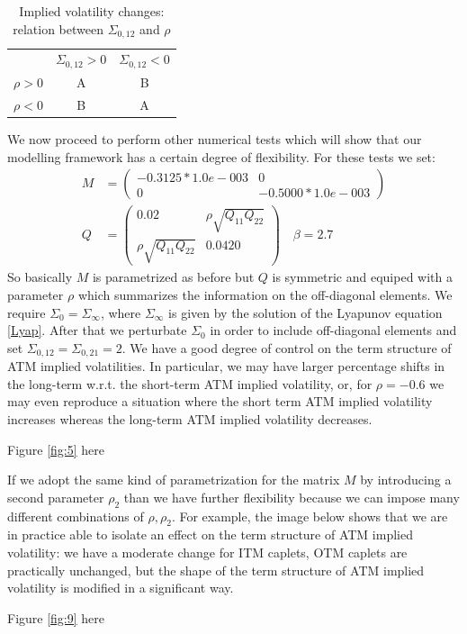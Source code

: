 \begin{table}[h]
\centering
	\begin{tabular}{ccc}
	 &$\Sigma_{0,12}>0$&$\Sigma_{0,12}<0$\\
	 $\rho>0$&A&B\\
	 $\rho<0$&B&A\\
	\end{tabular}
	\caption{Implied volatility changes: relation between $\Sigma_{0,12}$ and $\rho$}
	\label{tab:ImpliedVolatilityChanges_rho}
\end{table}

We now proceed to perform other numerical tests which will show that our modelling framework has a certain degree of flexibility. For these tests we set:
\begin{align}
M&=\left(\begin{array}{cc} -0.3125*1.0e-003&0\\ 0& -0.5000*1.0e-003\end{array}\right)\nonumber\\
Q&=\left(\begin{array}{cc} 0.02&\rho \sqrt{Q_{11}Q_{22}}\\ \rho \sqrt{Q_{11}Q_{22}}&0.0420\end{array}\right)\quad \beta=2.7\nonumber
\end{align}
So basically $M$ is parametrized  as before but $Q$ is symmetric and equiped with a parameter $\rho$ which summarizes the information on the off-diagonal elements. We require $\Sigma_0=\Sigma_\infty$, where $\Sigma_\infty$ is given by the solution of the Lyapunov equation \eqref{Lyap}. After that we perturbate $\Sigma_0$ in order to include off-diagonal elements and set $\Sigma_{0,12}=\Sigma_{0,21}=2$.
We have a good degree of control on the term structure of ATM implied volatilities. In particular, we may have larger percentage shifts in the long-term w.r.t. the short-term ATM implied volatility, or, for $\rho=-0.6$ we may even reproduce a situation where the short term ATM implied volatility increases whereas the long-term ATM implied volatility decreases.
\begin{center}
Figure \eqref{fig:5}  here
\end{center}

If we adopt the same kind of parametrization for the matrix $M$ by introducing a second parameter $\rho_2$ than we have further flexibility because we can impose many different combinations of $\rho,\rho_2$. For example, the image below shows that we are in practice able  to isolate an effect on the term structure of ATM implied volatility: we have a moderate change for ITM caplets, OTM caplets are practically unchanged, but the shape of the term structure of ATM implied volatility is modified in a significant way.
\begin{center}
Figure \eqref{fig:9}  here
\end{center}

